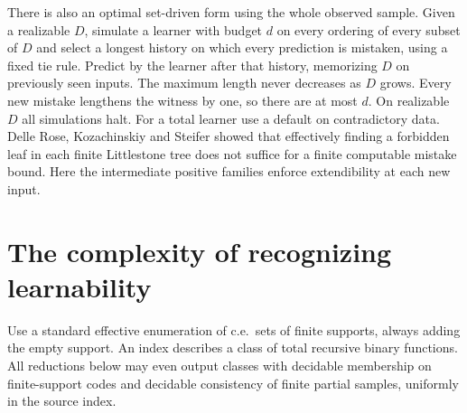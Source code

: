 \documentclass[11pt]{article}
\begin{document}
There is also an optimal set-driven form using the whole observed sample. Given a realizable $D$, simulate a learner with budget $d$ on every ordering of every subset of $D$ and select a longest history on which every prediction is mistaken, using a fixed tie rule. Predict by the learner after that history, memorizing $D$ on previously seen inputs. The maximum length never decreases as $D$ grows. Every new mistake lengthens the witness by one, so there are at most $d$. On realizable $D$ all simulations halt. For a total learner use a default on contradictory data. Delle Rose, Kozachinskiy and Steifer \cite{eldim} showed that effectively finding a forbidden leaf in each finite Littlestone tree does not suffice for a finite computable mistake bound. Here the intermediate positive families enforce extendibility at each new input.

\section{The complexity of recognizing learnability}
Use a standard effective enumeration of c.e.\ sets of finite supports, always adding the empty support. An index describes a class of total recursive binary functions. All reductions below may even output classes with decidable membership on finite-support codes and decidable consistency of finite partial samples, uniformly in the source index.
\end{document}
